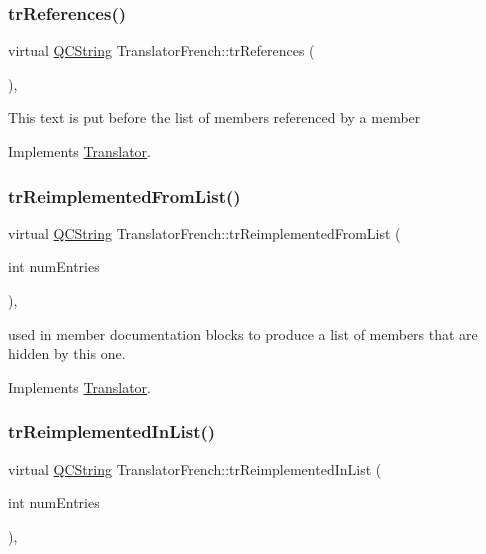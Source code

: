\subsubsection{\texorpdfstring{trReferences()}{trReferences()}}
{\footnotesize\ttfamily virtual \mbox{\hyperlink{class_q_c_string}{Q\+C\+String}} Translator\+French\+::tr\+References (\begin{DoxyParamCaption}{ }\end{DoxyParamCaption})\hspace{0.3cm}{\ttfamily [inline]}, {\ttfamily [virtual]}}

This text is put before the list of members referenced by a member 

Implements \mbox{\hyperlink{class_translator}{Translator}}.

\mbox{\label{class_translator_french_ac6ced2a18a5eb5b18bec0b1b19066840}} 
\subsubsection{\texorpdfstring{trReimplementedFromList()}{trReimplementedFromList()}}
{\footnotesize\ttfamily virtual \mbox{\hyperlink{class_q_c_string}{Q\+C\+String}} Translator\+French\+::tr\+Reimplemented\+From\+List (\begin{DoxyParamCaption}\item[{int}]{num\+Entries }\end{DoxyParamCaption})\hspace{0.3cm}{\ttfamily [inline]}, {\ttfamily [virtual]}}

used in member documentation blocks to produce a list of members that are hidden by this one. 

Implements \mbox{\hyperlink{class_translator}{Translator}}.

\mbox{\label{class_translator_french_a4eb7f8b181ff75073947aaf7970bac50}} 
\subsubsection{\texorpdfstring{trReimplementedInList()}{trReimplementedInList()}}
{\footnotesize\ttfamily virtual \mbox{\hyperlink{class_q_c_string}{Q\+C\+String}} Translator\+French\+::tr\+Reimplemented\+In\+List (\begin{DoxyParamCaption}\item[{int}]{num\+Entries }\end{DoxyParamCaption})\hspace{0.3cm}{\ttfamily [inline]}, {\ttfamily [virtual]}}

